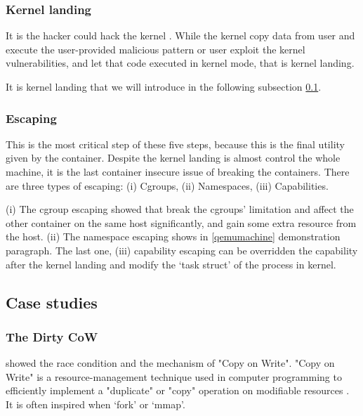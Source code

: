 \subsubsection{Kernel landing}

It is the hacker could hack the kernel
\cite{gaspar2006root, dam2018automatic, jimenez2016vulnerability, 10.1007/978-1-4020-8739-4_86}.
While the kernel copy data from user and execute the user-provided malicious pattern
or user exploit the kernel vulnerabilities, and let that code executed in kernel mode, that is kernel landing.

It is kernel landing that we will introduce in the following subsection \ref{k_case}.

\subsubsection{Escaping}

This is the most critical step of these five steps, because this is the final utility given by the
container. Despite the kernel landing is almost control the whole machine, it is the last container
insecure issue of breaking the containers. There are three types of escaping: (\Rn{1}) Cgroups,
(\Rn{2}) Namespaces, (\Rn{3}) Capabilities.

(\Rn{1}) The cgroup escaping showed that \textcite{10.1145/3319535.3354227} break the
cgroups' limitation and affect the other container on the same host significantly, and gain
some extra resource from the host. (\Rn{2}) The namespace escaping shows in \ref{qemumachine}
demonstration paragraph.
The last one, (\Rn{3}) capability escaping can be overridden the capability after the kernel landing
and modify the `task struct' of the process in kernel.

\subsection{Case studies}
\label{k_case}

\subsubsection{The Dirty CoW}
\textcite{8019988} showed the race condition and the mechanism of "Copy on
Write". "Copy on Write" is a resource-management technique used in computer programming
to efficiently implement a "duplicate" or "copy" operation on modifiable resources \cite{6394426}.
It is often inspired when `fork' or `mmap'.


